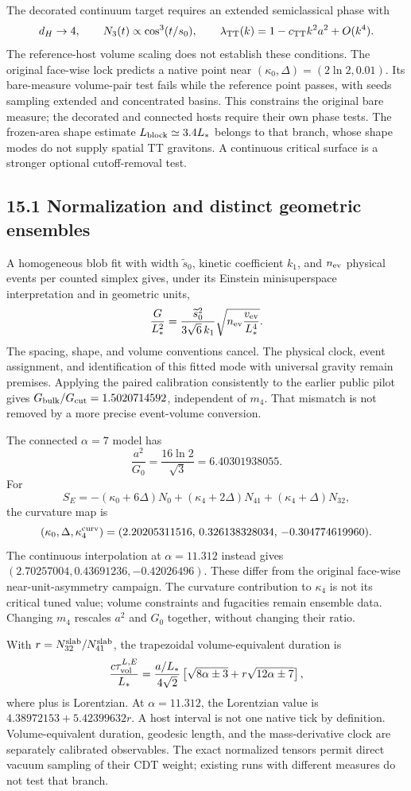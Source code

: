 \documentclass[11pt]{article}
\begin{document}
The decorated continuum target requires an extended semiclassical phase with
\[
d_H\to4,
\qquad
N_3(t)\propto\cos^3(t/s_0),
\qquad
\lambda_{\rm TT}(k)=1-c_{\rm TT}k^2a^2+O(k^4).
\]
The reference-host volume scaling does not establish these conditions. The original face-wise lock predicts a native point near $(\kappa_0,\Delta)=(2\ln2,0.01)$. Its bare-measure volume-pair test fails while the reference point passes, with seeds sampling extended and concentrated basins. This constrains the original bare measure; the decorated and connected hosts require their own phase tests. The frozen-area shape estimate $L_{\rm block}\simeq3.4L_*$ belongs to that branch, whose shape modes do not supply spatial TT gravitons. A continuous critical surface is a stronger optional cutoff-removal test.

\subsection{15.1 Normalization and distinct geometric ensembles}

A homogeneous blob fit with width \(\widetilde s_0\), kinetic
coefficient \(k_1\), and \(n_{\rm ev}\) physical events per
counted simplex gives, under its Einstein minisuperspace
interpretation and in geometric units,
\[
\frac{G}{L_*^2}
=\frac{\widetilde s_0^2}{3\sqrt6\,k_1}
\sqrt{n_{\rm ev}\frac{v_{\rm ev}}{L_*^4}}.
\]
The spacing, shape, and volume conventions cancel.
The physical clock, event assignment, and identification of
this fitted mode with universal gravity remain premises.
Applying the paired calibration consistently to the earlier
public pilot gives \(G_{\rm bulk}/G_{\rm cut}=1.5020714592\),
independent of \(m_4\). That mismatch is not removed by a
more precise event-volume conversion.

The connected \(\alpha=7\) model has
\[
\frac{a^2}{G_0}=\frac{16\ln2}{\sqrt3}=6.40301938055.
\]
For
\[
S_E=-(\kappa_0+6\Delta)N_0
+(\kappa_4+2\Delta)N_{41}+(\kappa_4+\Delta)N_{32},
\]
the curvature map is
\[
(\kappa_0,\Delta,\kappa_4^{\rm curv})
=(2.20205311516,\,0.326138328034,\,-0.304774619960).
\]
The continuous interpolation at \(\alpha=11.312\) instead
gives \((2.70257004,0.43691236,-0.42026496)\).
These differ from the original face-wise near-unit-asymmetry
campaign. The curvature contribution to \(\kappa_4\) is not
its critical tuned value; volume constraints and fugacities
remain ensemble data. Changing \(m_4\) rescales \(a^2\) and
\(G_0\) together, without changing their ratio.

With \(r=N_{32}^{\rm slab}/N_{41}^{\rm slab}\), the trapezoidal
volume-equivalent duration is
\[
\frac{c\tau_{\rm vol}^{L,E}}{L_*}
=\frac{a/L_*}{4\sqrt2}
\left[\sqrt{8\alpha\mathbin{\pm}3}
+r\sqrt{12\alpha\mathbin{\pm}7}\right],
\]
where plus is Lorentzian. At \(\alpha=11.312\), the Lorentzian
value is \(4.38972153+5.42399632r\).
A host interval is not one native tick by definition.
Volume-equivalent duration, geodesic length, and the
mass-derivative clock are separately calibrated observables.
The exact normalized tensors permit direct vacuum sampling
of their CDT weight; existing runs with different measures
do not test that branch.
\end{document}
